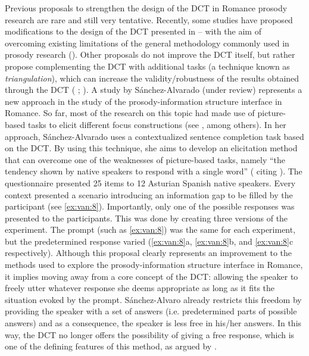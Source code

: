 \documentclass[output=paper]{LSP/langsci}
\begin{document}
Previous proposals to strengthen the design of the DCT in Romance prosody research are rare and still very tentative. Recently, some studies have proposed modifications to the design of the DCT presented in -- with the aim of overcoming existing limitations of the general methodology commonly used in prosody research (\citealt{ElviraGarcia2017,SanchezAlvarado.2018}). Other pro\-po\-sals do not improve the DCT itself, but rather propose complementing the DCT with additional tasks (a technique known as \textit{triangulation}), which can increase the validity/robustness of the results obtained through the DCT (\citeauthor{Vanrell2014evidentiality} \citeyear*{Vanrell2014evidentiality}; \citealt{Borras-Comes2015}). A study by Sánchez-Alvarado (under review) represents a new approach in the study of the prosody-information structure interface in Romance. So far, most of the research on this topic had made use of picture-based tasks to elicit different focus constructions (see \citealt{Gabriel2007,Muntendam2009,Vanrell2013catalanspanish,Feldhausen2014,FeldhausenVanrell2015}, among others). In her approach, Sánchez-Alvarado uses a contextualized sentence completion task based on the DCT. By using this technique, she aims to develop an elicitation method that can overcome one of the weaknesses of picture-based tasks, namely “the tendency shown by native speakers to respond with a single word” (\citealt{SanchezAlvarado.2018} citing \citealt{Ortega-Llebaria2014}). The questionnaire presented 25 items to 12 Asturian Spanish native speakers. Every context presented a scenario introducing an information gap to be filled by the participant (see \ref{ex:van:8}). Importantly, only one of the possible responses was presented to the par\-ti\-ci\-pants. This was done by creating three versions of the experiment. The prompt (such as \ref{ex:van:8}) was the same for each experiment, but the predetermined response varied (\ref{ex:van:8}a, \ref{ex:van:8}b, and \ref{ex:van:8}c respectively). Although this proposal clearly represents an improvement to the methods used to explore the prosody-information structure interface in Romance, it implies moving away from a core concept of the DCT: allowing the speaker to freely utter whatever response she deems appropriate as long as it fits the situation evoked by the prompt. Sánchez-Alvaro already restricts this freedom by providing the speaker with a set of answers (i.e. predetermined parts of possible answers) and as a consequence, the speaker is less free in his/her answers. In this way, the DCT no longer offers the possibility of giving a free response, which is one of the defining features of this method, as argued by \citet{Kwon2004}. 
 
\end{document}
